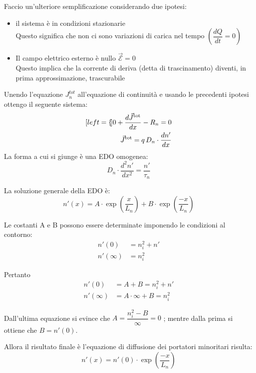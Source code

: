 Faccio un'ulteriore semplificazione considerando due ipotesi:\\
\begin{itemize}
    \item [\textbf{Hp.1}] il sistema è in condizioni stazionarie\\
        Questo significa che non ci sono variazioni di carica nel tempo $(\dfrac{dQ}{dt}=0)$\\
    \item [\textbf{Hp.2}] Il campo elettrico esterno è nullo $\mathcal{\vec{E}}=0$\\
        Questo implica che la corrente di deriva (detta di trascinamento) diventi, in prima approssimazione, trascurabile
\end{itemize}
Unendo l'equazione  $J_n^{tot}$ all'equazione di continuità e usando le precedenti ipotesi ottengo il seguente sistema:
%
\begin{alignat*}{4}[left = \empheqlbrace]
   0 + \dfrac{d\vec{J}^{\text{tot}}}{dx} - R_n = 0  \\
    \vec{J}^{\text{tot}}= q\,D_n \cdot \frac{dn'}{dx}
\end{alignat*}
%
La forma a cui si giunge è una EDO omogenea:
%
\begin{equation}
    D_n \cdot \dfrac{d^2 n'}{dx^2}= \dfrac{n'}{\tau_n}
\end{equation}
%
\begin{ripasso}
La soluzione generale della EDO è:
\begin{equation*}
    n'(x)=A\cdot \exp \left( \dfrac{x}{L_n}\right) + B \cdot \exp \left( \dfrac{-x}{L_n} \right)
\end{equation*}

Le costanti A e B possono essere determinate imponendo le condizioni al contorno:
\begin{align*}
    n'(0)&=n_i^2+n' \\
    n'(\infty)&=n_i^2
\end{align*}

Pertanto
\begin{align*}
    n'(0)&=A+B=n_i^2+n'\\
    n'(\infty)&=A\cdot \infty+B=n_i^2
\end{align*}

Dall'ultima equazione si evince che $A=\dfrac{n_i^2-B}{\infty}=0$ ; mentre dalla prima si ottiene che $B=n'(0)$.\\
\end{ripasso}
%
Allora il risultato finale è l'equazione di diffusione dei portatori minoritari risulta:
\begin{equation}
    n'(x)=n'(0) \cdot \exp \left( \dfrac{-x}{L_n}\right)
\end{equation}

